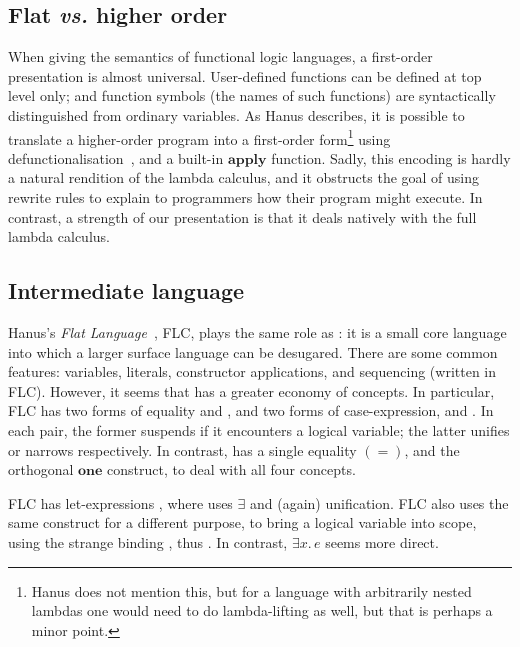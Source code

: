 \documentclass[acmsmall,review,anonymous,dvipsnames]{acmart}
\newcommand{\Varid}[1]{\mathit{#1}}
\newcommand{\vs}{\emph{vs.}}
\begin{document}
\subsection{Flat {\vs} higher order}

When giving the semantics
of functional logic languages, a first-order presentation is almost universal.
User-defined functions can be defined at top level only;
and function symbols (the names of such functions) are syntactically
distinguished from ordinary variables. As Hanus describes, it is possible
to translate a higher-order program into a first-order
form\footnote{
  Hanus does not mention this, but for a language with arbitrarily nested lambdas
  one would need to do lambda-lifting as well, but that is perhaps a minor point.}
using defunctionalisation~\cite[Section 3.3]{hanus:survey}, and a built-in
\ensuremath{\textbf{apply}} function.
Sadly, this encoding is hardly a natural rendition of the lambda calculus, and
it obstructs the goal of using rewrite rules to explain to programmers how
their program might execute. In contrast, a strength of our \versecalc{}
presentation is that it deals natively with the full lambda calculus.

\subsection{Intermediate language}

Hanus's \emph{Flat Language}~\cite[Fig 1]{hanus:semantics}, FLC, plays the same role as \versecalc{}:
it is a small core language
into which a larger surface language can be desugared.
There are some common features: variables, literals, constructor applications,
and sequencing (written  in FLC).
However, it seems that \versecalc{} has a greater economy of concepts.
In particular, FLC
has two forms of equality  and , and two forms
of case-expression,  and .  In each pair, the former suspends
if it encounters a logical variable; the latter unifies or narrows
respectively. In contrast, \versecalc{}
has a single equality \ensuremath{(\mathrel{=})}, and the orthogonal \ensuremath{\textbf{one}} construct, to deal with all four concepts.

FLC has let-expressions , where \versecalc{} uses
\ensuremath{\exists} and (again) unification.
FLC also uses the same construct for a different purpose, to
bring a logical variable into scope, using the strange binding , thus .
In contrast, \ensuremath{\exists\Varid{x}.\,\Varid{e}} seems more direct.
\end{document}
